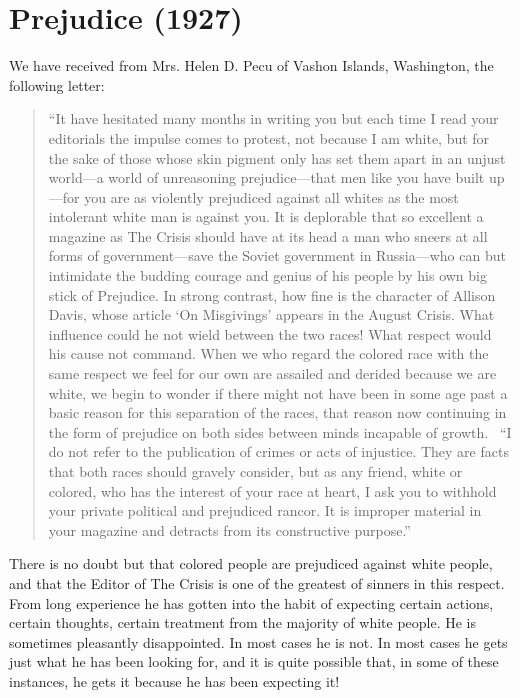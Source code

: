 \documentclass[letterpaper,10pt,english]{jupyterBook}
\begin{document}
\section{Prejudice (1927)}
\label{\detokenize{Volumes/34/09/prejudice:prejudice-1927}}\label{\detokenize{Volumes/34/09/prejudice::doc}}
\sphinxAtStartPar
We have received from Mrs. Helen D. Pecu of Vashon Islands, Washington, the following letter:
\begin{quote}

\sphinxAtStartPar
“It have hesitated many months in writing you but each time I read your editorials the impulse comes to protest, not because I am white, but for the sake of those whose skin pigment only has set them apart in an unjust world—a world of unreasoning prejudice—that men like you have built up —for you are as violently prejudiced against all whites as the most intolerant white man is against you. It is deplorable that so excellent a magazine as The Crisis  should have at its head a man who sneers at all forms of government—save the Soviet government in Russia—who can but intimidate the budding courage and genius of his people by his own big stick of Prejudice. In strong contrast, how fine is the character of Allison Davis, whose article ‘On Misgivings’ appears in the August Crisis. What influence could he not wield between the two races! What respect would his cause not command. When we who regard the colored race with the same respect we feel for our own are assailed and derided because we are white, we begin to wonder if there might not have been in some age past a basic reason for this separation of the races, that reason now continuing in the form of prejudice on both sides between minds incapable of growth.
 “I do not refer to the publication of crimes or acts of injustice. They are facts that both races should gravely consider, but as any friend, white or colored, who has the interest of your race at heart, I ask you to withhold your private political and prejudiced rancor. It is improper material in your magazine and detracts from its constructive purpose.”
\end{quote}

\sphinxAtStartPar
There is no doubt but that colored people are prejudiced against white people, and that the Editor of The Crisis is one of the greatest of sinners in this respect. From long experience he has gotten into the habit of expecting certain actions, certain thoughts, certain treatment from the majority of white people. He is sometimes pleasantly disappointed. In most cases he is not. In most cases he gets just what he has been looking for, and it is quite possible that, in some of these instances, he gets it because he has been expecting it!
\end{document}
